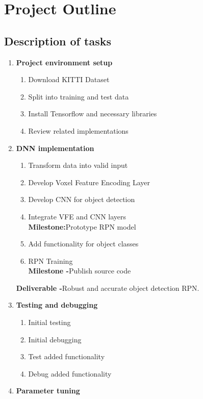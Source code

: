 \let\textcircled=\pgftextcircled
\chapter{Project Outline}
\label{chap:proj_outline}

\section{Description of tasks}

\begin{enumerate}
    \item \textbf{Project environment setup} 
    	\begin{enumerate}
    		\item Download KITTI Dataset
    		\item Split into training and test data
    		\item Install Tensorflow and necessary libraries 
    		\item Review related implementations
    	\end{enumerate}
    \item \textbf{DNN implementation}
   		\begin{enumerate}
   			\item Transform data into valid input
   			\item Develop Voxel Feature Encoding Layer
   			\item Develop CNN for object detection
   			\item Integrate VFE and CNN layers \\ 
   			\textbf{Milestone:}Prototype RPN model 
   			\item Add functionality for object classes 
   			\item RPN Training \\ 
   			\textbf{Milestone -}Publish source code 
   		\end{enumerate}
   	\textbf{Deliverable -}Robust and accurate object detection RPN.
    \item \textbf{Testing and debugging} 
    	\begin{enumerate}
    		\item Initial testing
    		\item Initial debugging
    		\item Test added functionality 
    		\item Debug added functionality 
    	\end{enumerate}
    \item \textbf{Parameter tuning} 

\end{enumerate}

